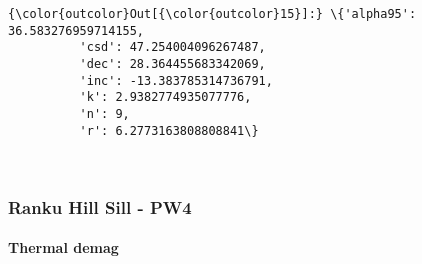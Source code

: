 \documentclass{article}
\begin{document}
            \begin{Verbatim}[commandchars=\\\{\}]
{\color{outcolor}Out[{\color{outcolor}15}]:} \{'alpha95': 36.583276959714155,
          'csd': 47.254004096267487,
          'dec': 28.364455683342069,
          'inc': -13.383785314736791,
          'k': 2.9382774935077776,
          'n': 9,
          'r': 6.2773163808808841\}
\end{Verbatim}
        
    \begin{center}
    \end{center}
    { \hspace*{\fill} \\}
    
    \subsubsection{Ranku Hill Sill - PW4}\label{ranku-hill-sill---pw4}

    \paragraph{Thermal demag}\label{thermal-demag}
\end{document}
